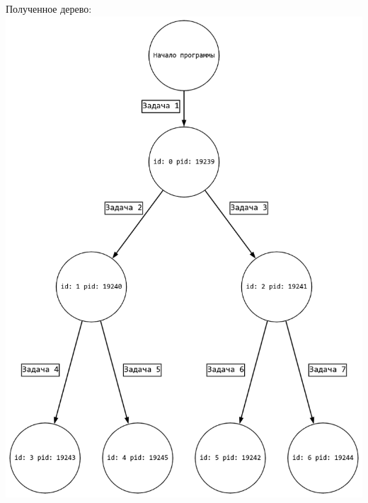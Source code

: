 \documentclass[a4paper,14pt]{extarticle}
\begin{document}
Полученное дерево:\\
\includegraphics[width=140mm]{main.png}\\
\end{document}
